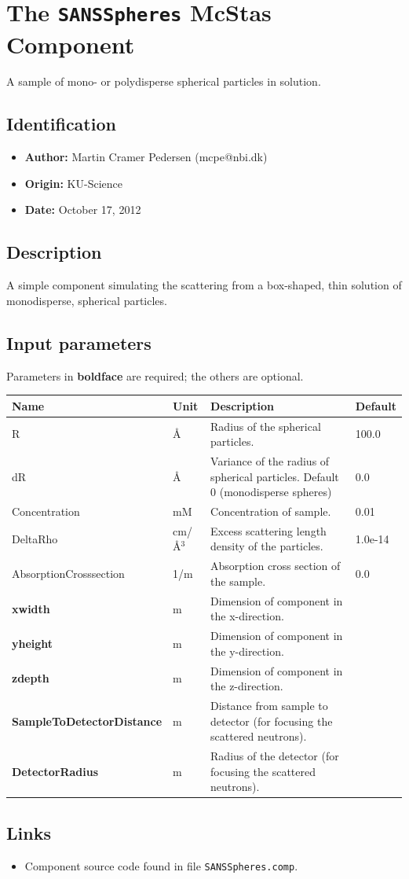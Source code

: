\section{The \texttt{SANSSpheres} McStas Component}
A sample of mono- or polydisperse spherical particles in solution.

\subsection*{Identification}
\begin{itemize}
  \item \textbf{Author:} Martin Cramer Pedersen (mcpe@nbi.dk)
  \item \textbf{Origin:} KU-Science
  \item \textbf{Date:} October 17, 2012
\end{itemize}

\subsection*{Description}
A simple component simulating the scattering from a box-shaped, thin solution of monodisperse, spherical particles.

\subsection*{Input parameters}
Parameters in \textbf{boldface} are required; the others are optional.

\begin{longtable}{p{}p{}p{}p{}}
\toprule
\textbf{Name} & \textbf{Unit} & \textbf{Description} & \textbf{Default} \\
\midrule
\endhead
R & \AA{} & Radius of the spherical particles. & 100.0 \\
dR & \AA{} & Variance of the radius of spherical particles. Default 0 (monodisperse spheres) & 0.0 \\
Concentration & mM & Concentration of sample. & 0.01 \\
DeltaRho & cm/\AA{}$^{3}$ & Excess scattering length density of the particles. & 1.0e-14 \\
AbsorptionCrosssection & 1/m & Absorption cross section of the sample. & 0.0 \\
\textbf{xwidth} & m & Dimension of component in the x-direction. &  \\
\textbf{yheight} & m & Dimension of component in the y-direction. &  \\
\textbf{zdepth} & m & Dimension of component in the z-direction. &  \\
\textbf{SampleToDetectorDistance} & m & Distance from sample to detector (for focusing the scattered neutrons). &  \\
\textbf{DetectorRadius} & m & Radius of the detector (for focusing the scattered neutrons). &  \\
\bottomrule
\end{longtable}

\subsection*{Links}
\begin{itemize}
  \item Component source code found in file \texttt{SANSSpheres.comp}.
\end{itemize}
